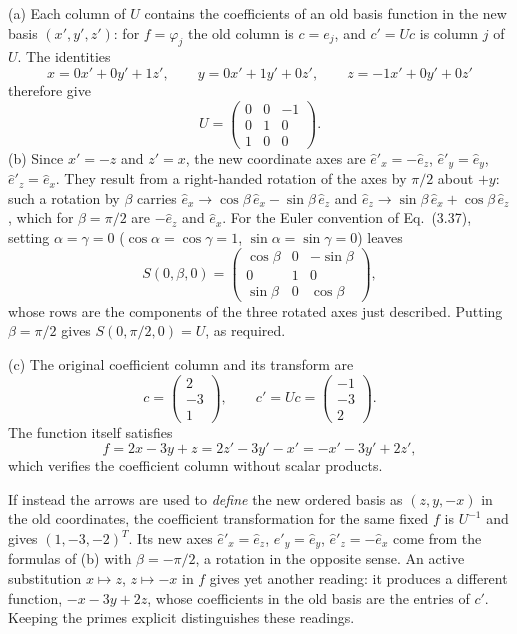 (a) Each column of $U$ contains the coefficients of an old basis function
in the new basis $(x',y',z')$: for $f=\varphi_j$ the old column is
$c=e_j$, and $c'=Uc$ is column $j$ of $U$. The identities
\[
x=0x'+0y'+1z',\qquad y=0x'+1y'+0z',\qquad
z=-1x'+0y'+0z'
\]
therefore give
\[
\boxed{U=\begin{pmatrix}0&0&-1\\0&1&0\\1&0&0\end{pmatrix}.}
\]
(b) Since $x'=-z$ and $z'=x$, the new coordinate axes are
$\hat e'_x=-\hat e_z$, $\hat e'_y=\hat e_y$,
$\hat e'_z=\hat e_x$. They result from a right-handed rotation of the
axes by $\pi/2$ about $+y$: such a rotation by $\beta$ carries
$\hat e_x\to\cos\beta\,\hat e_x-\sin\beta\,\hat e_z$ and
$\hat e_z\to\sin\beta\,\hat e_x+\cos\beta\,\hat e_z$, which for
$\beta=\pi/2$ are $-\hat e_z$ and $\hat e_x$. For the Euler convention
of Eq.~(3.37), setting $\alpha=\gamma=0$ ($\cos\alpha=\cos\gamma=1$,
$\sin\alpha=\sin\gamma=0$) leaves
\[
S(0,\beta,0)=\begin{pmatrix}
\cos\beta&0&-\sin\beta\\0&1&0\\\sin\beta&0&\cos\beta
\end{pmatrix},
\]
whose rows are the components of the three rotated axes just
described. Putting $\beta=\pi/2$ gives $S(0,\pi/2,0)=U$, as required.

(c) The original coefficient column and its transform are
\[
c=\begin{pmatrix}2\\-3\\1\end{pmatrix},\qquad
c'=Uc=\begin{pmatrix}-1\\-3\\2\end{pmatrix}.
\]
The function itself satisfies
\[
f=2x-3y+z=2z'-3y'-x'=-x'-3y'+2z',
\]
which verifies the coefficient column without scalar products.

If instead the arrows are used to \emph{define} the new ordered basis
as $(z,y,-x)$ in the old coordinates, the coefficient transformation for
the same fixed $f$ is $U^{-1}$ and gives $(1,-3,-2)^T$. Its new axes
$\hat e'_x=\hat e_z$, $\hat e'_y=\hat e_y$, $\hat e'_z=-\hat e_x$ come
from the formulas of (b) with $\beta=-\pi/2$, a rotation in the opposite
sense. An active substitution
$x\mapsto z$, $z\mapsto-x$ in $f$ gives yet another reading: it produces
a different function, $-x-3y+2z$, whose coefficients in the old basis
are the entries of $c'$. Keeping the primes explicit distinguishes these
readings.

